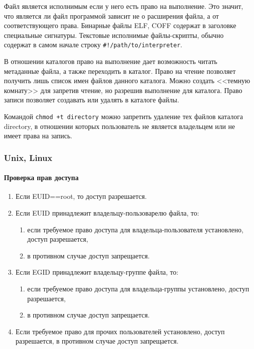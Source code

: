 Файл является исполнимым если у него есть право на выполнение. Это значит, что является ли файл программой зависит не о расширения файла, а от соответствующего права. Бинарные файлы ELF, COFF содержат в заголовке специальные сигнатуры. Текстовые исполнимые файлы-скрипты, обычно содержат в самом начале строку \verb"#!/path/to/interpreter".

В отношении каталогов право на выполнение дает возможность читать метаданные файла, а также переходить в каталог. Право на чтение позволяет получить лишь список имен файлов данного каталога. Можно создать <<темную комнату>> для запретив чтение, но разрешив выполнение для каталога. Право записи позволяет создавать или удалять в каталоге файлы.

Командой \verb"chmod +t directory" можно запретить удаление тех файлов каталога directory, в отношении которых пользователь не является владельцем или не имеет права на запись.


\begin{frame}
    \frametitle{Unix, Linux}
    \framesubtitle{Проверка прав доступа}
    
    \begin{enumerate}
        \item Если EUID==root, то доступ разрешается.
        \item Если EUID принадлежит владельцу-пользоварелю файла, то:
        \begin{enumerate}
            \item если требуемое право доступа для владельца-пользователя установлено, доступ разрешается,
            \item в противном случае доступ запрещается.
        \end{enumerate}
        \item Если EGID принадлежит владельцу-группе файла, то:
        \begin{enumerate}
            \item если требуемое право доступа для владельца-группы установлено, доступ разрешается,
            \item в противном случае доступ запрещается.
        \end{enumerate}
        \item Если  требуемое право для прочих пользователей установлено, доступ разрешается, 
            в противном случае доступ запрещается.
    \end{enumerate}
\end{frame}


